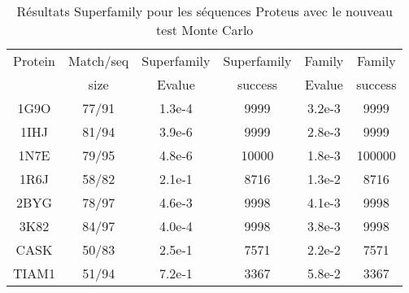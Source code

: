     \begin{table}[h]
           \raggedleft{}

      \begin{tabular}{cccccc}

        \toprule
        Protein & Match/seq & Superfamily & Superfamily & Family & Family \\
                & size      & Evalue      & success     & Evalue & success\\
        \cmidrule{1-6}
        1G9O  & 77/91 & 1.3e-4  &  9999 & 3.2e-3 &  9999  \\
        1IHJ  & 81/94 & 3.9e-6  &  9999 & 2.8e-3 &  9999  \\
        1N7E  & 79/95 & 4.8e-6  & 10000 & 1.8e-3 & 100000 \\
        1R6J  & 58/82 & 2.1e-1  &  8716 & 1.3e-2 &  8716  \\
        2BYG  & 78/97 & 4.6e-3  &  9998 & 4.1e-3 &  9998  \\
        3K82  & 84/97 & 4.0e-4  &  9998 & 3.8e-3 &  9998  \\
        CASK  & 50/83 & 2.5e-1  &  7571 & 2.2e-2 &  7571  \\
        TIAM1 & 51/94 & 7.2e-1  &  3367 & 5.8e-2 &  3367  \\
        \bottomrule        
      \end{tabular}   
     \caption{Résultats Superfamily pour les séquences Proteus avec le nouveau test Monte Carlo}   
\label{tab:superfamily_Old_MCtest}       
\end{table}



